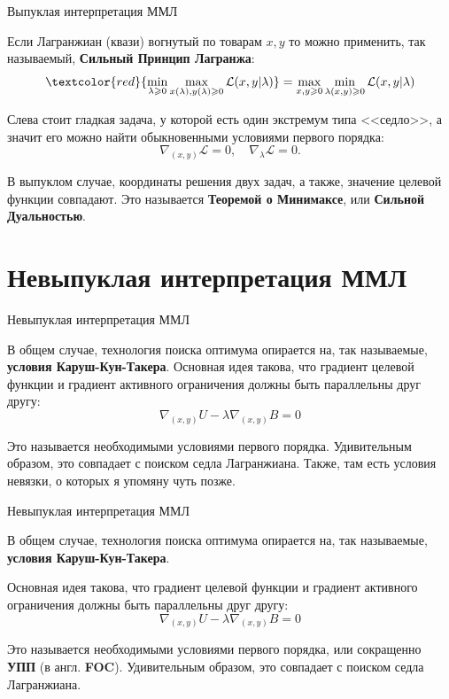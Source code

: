 \documentclass{beamer}
\begin{document}
\begin{frame}{Выпуклая интерпретация ММЛ}

Если Лагранжиан (квази) вогнутый по товарам $x,y$ то можно применить, так называемый, \textbf{Сильный Принцип Лагранжа}:
$$ \textcolor{red}{\min_{\lambda \geqslant 0} \max_{x(\lambda),y(\lambda) \geqslant 0} \mathcal{L}(x,y | \lambda)} =  \max_{x,y \geqslant 0} \min_{\lambda(x,y) \geqslant 0} \mathcal{L}(x,y | \lambda) $$ 

Слева стоит гладкая задача, у которой есть один экстремум типа <<седло>>, а значит его можно найти обыкновенными условиями первого порядка:
$$ \nabla_{(x,y)} \mathcal{L} = 0, \quad \nabla_{\lambda} \mathcal{L} = 0.$$

В выпуклом случае, координаты решения двух задач, а также, значение целевой функции совпадают. Это называется \textbf{Теоремой о Минимаксе}, или \textbf{Сильной Дуальностью}.

\end{frame}

\section{Невыпуклая интерпретация ММЛ}

\begin{frame}{Невыпуклая интерпретация ММЛ}

В общем случае, технология поиска оптимума опирается на, так называемые, \textbf{условия Каруш-Кун-Такера}. Основная идея такова, что градиент целевой функции и градиент активного ограничения должны быть параллельны друг другу:
$$ \nabla_{(x,y)}U - \lambda \nabla_{(x,y)} B = 0$$

Это называется необходимыми условиями первого порядка. Удивительным образом, это совпадает с поиском седла Лагранжиана. Также, там есть условия невязки, о которых я упомяну чуть позже.

\end{frame}

\begin{frame}{Невыпуклая интерпретация ММЛ}

В общем случае, технология поиска оптимума опирается на, так называемые, \textbf{условия Каруш-Кун-Такера}. 

Основная идея такова, что градиент целевой функции и градиент активного ограничения должны быть параллельны друг другу:
$$ \nabla_{(x,y)}U - \lambda \nabla_{(x,y)} B = 0$$

Это называется необходимыми условиями первого порядка, или сокращенно \textbf{УПП} (в англ. \textbf{FOC}). Удивительным образом, это совпадает с поиском седла Лагранжиана.

\end{frame}
\end{document}
